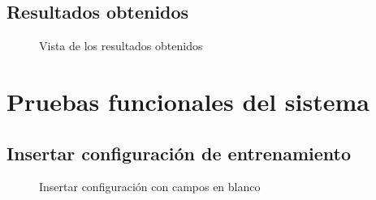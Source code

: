 {\section{Resultados obtenidos}

\begin{figure}[H]
\centering
 \caption{Vista de los resultados obtenidos}
 \label{fig:notas} 
\end{figure}

\chapter{Pruebas funcionales del sistema}

\section{Insertar configuración de entrenamiento}
\begin{figure}[H]
\centering
 \caption{Insertar configuración con campos en blanco}
 \label{fig:cb} 
\end{figure}

}
